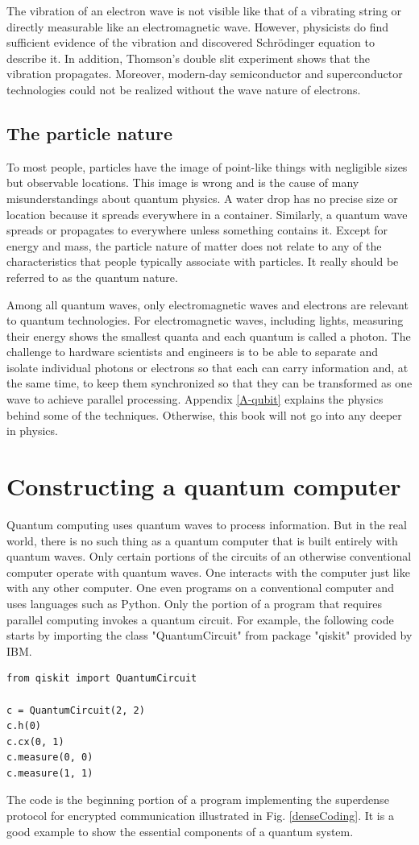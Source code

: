 \documentclass[oneside, letter, 12pt]{book}
\begin{document}
The vibration of an electron wave is not visible like that of a vibrating string or directly measurable like an electromagnetic wave. However, physicists do find sufficient evidence of the vibration and discovered Schrödinger equation to describe it. In addition, Thomson's double slit experiment\cite{THOMSON} shows that the vibration propagates. Moreover, modern-day semiconductor and superconductor technologies could not be realized without the wave nature of electrons.

\subsection{The particle nature}
To most people, particles have the image of point-like things with negligible sizes but observable locations. This image is wrong and is the cause of many misunderstandings about quantum physics. A water drop has no precise size or location because it spreads everywhere in a container. Similarly, a quantum wave spreads or propagates to everywhere unless something contains it. Except for energy and mass, the particle nature of matter does not relate to any of the characteristics that people typically associate with particles. It really should be referred to as the quantum nature.

Among all quantum waves, only electromagnetic waves and electrons are relevant to quantum technologies. For electromagnetic waves, including lights, measuring their energy shows the smallest quanta and each quantum is called a photon. The challenge to hardware scientists and engineers is to be able to separate and isolate individual photons or electrons so that each can carry information and, at the same time, to keep them synchronized so that they can be transformed as one wave to achieve parallel processing. Appendix \ref{A-qubit} explains the physics behind some of the techniques. Otherwise, this book will not go into any deeper in physics.

\section{Constructing a quantum computer}
Quantum computing uses quantum waves to process information. But in the real world, there is no such thing as a quantum computer that is built entirely with quantum waves. Only certain portions of the circuits of an otherwise conventional computer operate with quantum waves. One interacts with the computer just like with any other computer. One even programs on a conventional computer and uses languages such as Python. Only the portion of a program that requires parallel computing invokes a quantum circuit. For example, the following code starts by importing the class "QuantumCircuit" from package "qiskit" provided by IBM.
\begin{lstlisting}
from qiskit import QuantumCircuit

c = QuantumCircuit(2, 2)
c.h(0)
c.cx(0, 1)
c.measure(0, 0)
c.measure(1, 1)    
\end{lstlisting}
The code is the beginning portion of a program implementing the superdense protocol for encrypted communication illustrated in Fig. \ref{denseCoding}. It is a good example to show the essential components of a quantum system.
\end{document}
